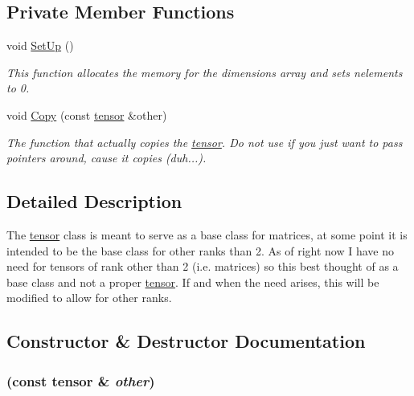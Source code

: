\subsection*{Private Member Functions}
\begin{DoxyCompactItemize}
\item 
void \hyperlink{classJKBuilder_1_1tensor_a1b06560e0e01a806b92c2386220d0b57}{SetUp} ()
\begin{DoxyCompactList}\small\item\em This function allocates the memory for the dimensions array and sets nelements to 0. \item\end{DoxyCompactList}\item 
void \hyperlink{classJKBuilder_1_1tensor_a60e1f7417550ba45971b688cc168d34f}{Copy} (const \hyperlink{classJKBuilder_1_1tensor}{tensor} \&other)
\begin{DoxyCompactList}\small\item\em The function that actually copies the \hyperlink{classJKBuilder_1_1tensor}{tensor}. Do not use if you just want to pass pointers around, cause it copies (duh...). \item\end{DoxyCompactList}\end{DoxyCompactItemize}


\subsection{Detailed Description}
The \hyperlink{classJKBuilder_1_1tensor}{tensor} class is meant to serve as a base class for matrices, at some point it is intended to be the base class for other ranks than 2. As of right now I have no need for tensors of rank other than 2 (i.e. matrices) so this best thought of as a base class and not a proper \hyperlink{classJKBuilder_1_1tensor}{tensor}. If and when the need arises, this will be modified to allow for other ranks. 

\subsection{Constructor \& Destructor Documentation}
\hypertarget{classJKBuilder_1_1tensor_a35bcdda56953bef8e76bfed569bbf54c}{
\subsubsection[{tensor}]{ (const {\bf tensor} \& {\em other})}}
\label{classJKBuilder_1_1tensor_a35bcdda56953bef8e76bfed569bbf54c}


